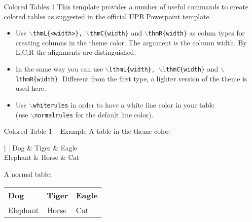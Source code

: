 \documentclass[
	] {beamer}
\begin{document}
\begin{frame}{Colored Tables 1}
	This template provides a number of useful commands to create colored tables as
	suggested in the official UPB Powerpoint template.
	\begin{itemize}
		\item Use \texttt{$\backslash$thmL\{<width>\}, $\backslash$thmC\{width\}} and
			\texttt{$\backslash$thmR\{width\}} as colum types for creating columns in
			the theme color. The argument is the column width. By L,C,R the
			alignments are distinguished.

		\item In the same way you can use \texttt{$\backslash$lthmL\{width\},
			$\backslash$lthmC\{width\}} and \texttt{$\backslash$lthmR\{width\}}.
			Different from the first type, a lighter version of the theme is used here.

		\item Use \texttt{$\backslash$whiterules} in order to have a white line
			color in your table\\
			(use \texttt{$\backslash$normalrules} for the default line color).
	\end{itemize}
\end{frame}



\begin{frame}{Colored Table 1 -- Example}
	A table in the theme color:

	\begin{center}
		\whiterules
		\begin{tabular}{\thmC{3cm} | \lthmC{3cm} | \thmC{3cm}}
			Dog & Tiger & Eagle\\
			\hline
			Elephant & Horse & Cat
		\end{tabular}
	\end{center}

	\vfill
	A normal table:

	\begin{center}
		\normalrules
		\begin{tabular}{p{3cm} | p{3cm} | p{3cm}}
			Dog & Tiger & Eagle\\
			\hline
			Elephant & Horse & Cat
		\end{tabular}
	\end{center}
\end{frame}
\end{document}
